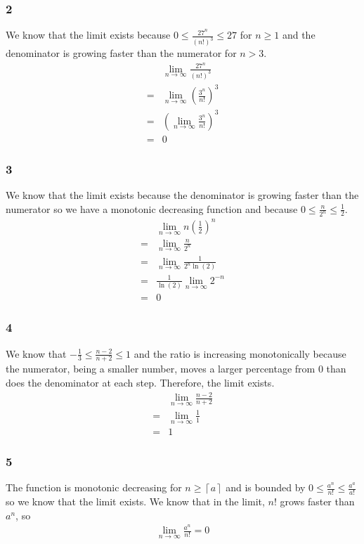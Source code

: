 \documentclass[12pt]{article}
\newcommand{\round}[1]{\left(       #1 \right)      }
\newcommand{\ceil} [1]{\left\lceil  #1 \right\rceil }
\begin{document}
\subsubsection*{2}
We know that the limit exists because $0 \leq \frac{27^n}{(n!)^3} \leq 27$ for $n \geq 1$ and the denominator is growing faster than the numerator for $n > 3$.
\begin{align*}
     & \lim_{n\to\infty} \frac{27^n}{(n!)^3} \\
    =& \lim_{n\to\infty} \round{\frac{3^n}{n!}}^3 \\
    =& \round{\lim_{n\to\infty} \frac{3^n}{n!}}^3 \\
    =& 0
\end{align*}

\subsubsection*{3}
We know that the limit exists because the denominator is growing faster than the numerator so we have a monotonic decreasing function and because $0 \leq \frac{n}{2^n} \leq \frac{1}{2}$.
\begin{align*}
     & \lim_{n\to\infty} n \round{\frac{1}{2}}^n \\
    =& \lim_{n\to\infty} \frac{n}{2^n} \\
    =& \lim_{n\to\infty} \frac{1}{2^n \ln(2)} \\
    =& \frac{1}{\ln(2)} \lim_{n\to\infty} 2^{-n} \\
    =& 0
\end{align*}

\subsubsection*{4}
We know that $-\frac{1}{3} \leq \frac{n-2}{n+2} \leq 1$ and the ratio is increasing monotonically because the numerator, being a smaller number, moves a larger percentage from 0 than does the denominator at each step. Therefore, the limit exists.
\begin{align*}
     & \lim_{n\to\infty} \frac{n - 2}{n + 2} \\
    =& \lim_{n\to\infty} \frac{1}{1} \\
    =& 1
\end{align*}

\subsubsection*{5}
The function is monotonic decreasing for $n \geq \ceil{a}$ and is bounded by $0 \leq \frac{a^n}{n!} \leq \frac{a^a}{a!}$ so we know that the limit exists. We know that in the limit, $n!$ grows faster than $a^n$, so
\begin{align*}
    \lim_{n\to\infty} \frac{a^n}{n!} = 0
\end{align*}
\end{document}
